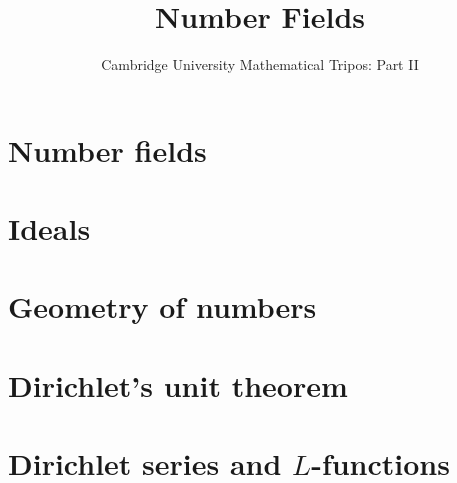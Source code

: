 \documentclass{article}
\title{Number Fields}
\author{Cambridge University Mathematical Tripos: Part II}
\begin{document}
\maketitle

\tableofcontentsnewpage{}

\section{Number fields}

\section{Ideals}

\section{Geometry of numbers}

\section{Dirichlet's unit theorem}

\section{Dirichlet series and \texorpdfstring{\( L \)}{L}-functions}

\end{document}
